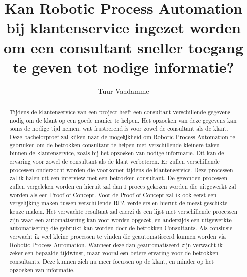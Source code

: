 \documentclass{hogent-article}
\title{Kan Robotic Process Automation bij klantenservice ingezet worden om een consultant sneller toegang te geven tot nodige informatie?}
\author{Tuur Vandamme}
\begin{document}
\begin{abstract}
  Tijdens de klantenservice van een project heeft een consultant verschillende gegevens nodig om de klant op een goede manier te helpen. Het opzoeken van deze gegevens kan soms de nodige tijd nemen, wat frustrerend is voor zowel de consultant als de klant. Deze bachelorproef zal kijken naar de mogelijkheid om Robotic Process Automation te gebruiken om de betrokken consultant te helpen met verschillende kleinere taken binnen de klantenservice, zoals bij het opzoeken van nodige informatie. Dit kan de ervaring voor zowel de consultant als de klant verbeteren. Er zullen verschillende processen onderzocht worden die voorkomen tijdens de klantenservice. Deze processen zal ik halen uit een interview met een betrokken consultant. De gevonden processen zullen vergeleken worden en hieruit zal dan 1 proces gekozen worden die uitgewerkt zal worden als een Proof of Concept. Voor de Proof of Concept zal ik ook eerst een vergelijking maken tussen verschillende RPA-verdelers en hieruit de meest geschikte keuze maken. Het verwachte resultaat zal enerzijds een lijst met verschillende processen zijn waar een automatisering kan voor worden opgezet, en anderzijds een uitgewerkte automatisering die gebruikt kan worden door de betrokken Consultants. Als conslusie verwacht ik veel kleine processen te vinden die geautomatiseerd kunnen worden via Robotic Process Automation. Wanneer deze dan geautomatiseerd zijn verwacht ik zeker een bepaalde tijdwinst, maar vooral een betere ervaring voor de betrokken consultants. Deze kunnen zich nu meer focussen op de klant, en minder op het opzoeken van informatie.
\end{abstract}

\tableofcontents



\printbibliography[heading=bibintoc]
\end{document}
